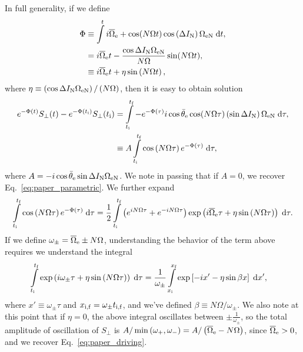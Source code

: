 \documentclass[11pt,
        usenames, %
        dvipsnames %
    ]{article}
\newcommand*{\p}[1]{\left(#1\right)}
\newcommand*{\s}[1]{\left[#1\right]}
\begin{document}
In full generality, if we define
\begin{align}
    \Phi &\equiv \int\limits^t
        i\overline{\Omega}_{\rm e} + \cos (N\Omega t)
            \cos \p{\Delta I_{\rm N}} \Omega_{\rm eN}\;\mathrm{d}t,\nonumber\\
        &= i\overline{\Omega}_{\rm e}t - \frac{\cos \Delta I_{\rm N}
            \Omega_{\rm eN}}{N\Omega}\sin (N\Omega t),\nonumber\\
        &\equiv i\overline{\Omega}_{\rm e}t + \eta \sin\p{N\Omega t},
\end{align}
where $\eta \equiv \p{\cos \Delta I_{\rm N} \Omega_{\rm eN}}/\p{N\Omega}$, then it is
easy to obtain solution
\begin{align}
    e^{-\Phi(t)} S_\perp(t) - e^{-\Phi\p{t_{\rm i}}}S_{\perp}(t_{\rm i}) &=
        \int\limits_{t_{\rm i}}^{t_{\rm f}}
            -e^{-\Phi(\tau)}
            i\cos \bar{\theta}_{\rm e} \cos (N\Omega \tau)\p{\sin \Delta I_{\rm
            N}} \Omega_{\rm eN}\;\mathrm{d}\tau,\nonumber\\
        &\equiv A\int\limits_{t_{\rm i}}^{t_{\rm f}}
            \cos\p{N \Omega \tau}e^{-\Phi(\tau)} \;\mathrm{d}\tau,
\end{align}
where $A = -i \cos \bar{\theta}_{\rm e} \sin \Delta I_{\rm N} \Omega_{\rm eN}$.
We note in passing that if $A = 0$, we recover Eq.~\eqref{eq:paper_parametric}.
We further expand
\begin{equation}
    \int\limits_{t_{\rm i}}^{t_{\rm f}} \cos\p{N \Omega \tau}e^{-\Phi(\tau)}
            \;\mathrm{d}\tau
        = \frac{1}{2}\int\limits_{t_{\rm i}}^{t_{\rm f}}
            \p{e^{iN\Omega \tau} + e^{-iN\Omega \tau}}
            \exp\p{i\overline{\Omega}_{\rm e}\tau + \eta \sin\p{N\Omega \tau}}
            \;\mathrm{d}\tau.
\end{equation}
If we define $\omega_{\pm} = \overline{\Omega}_{\rm e} \pm N\Omega$,
understanding the behavior of the term above requires we understand the integral
\begin{align}
    \int\limits_{t_{\rm i}}^{t_{\rm f}}
        \exp\p{i\omega_{\pm}\tau + \eta \sin\p{N\Omega \tau}}\;\mathrm{d}\tau
        &= \frac{1}{\omega_{\pm}}
            \int\limits_{x_{\rm i}}^{x_{\rm f}}
                \exp\s{-ix' - \eta \sin \beta x}\;\mathrm{d}x',
                \label{eq:key}
\end{align}
where $x' \equiv \omega_{\pm} \tau$ and $x_{\rm i, f} = \omega_{\pm} t_{\rm i,
f}$, and we've defined $\beta \equiv N\Omega / \omega_{\pm}$. We also note at
this point that if $\eta = 0$, the above integral oscillates between $\pm
\frac{1}{\omega_{\pm}}$, so the total amplitude of oscillation of $S_{\perp}$ is
$A / \min\p{\omega_+, \omega_-} = A / \p{\overline{\Omega}_{\rm e} - N\Omega}$,
since $\overline{\Omega}_{\rm e} > 0$, and we recover
Eq.~\eqref{eq:paper_driving}.
\end{document}
